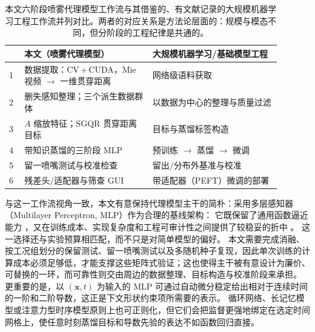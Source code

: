 \begin{table}[htbp]
\centering
\footnotesize
\caption{本文六阶段喷雾代理模型工作流与其借鉴的、有文献记录的大规模机器学习工程工作流并列对比。两者的对应关系是方法论层面的：规模与模态不同，但分阶段的工程纪律是共通的。}
\label{tab:workflow-mapping-zh}
\begin{tabular}{@{}p{0.05\linewidth}p{0.42\linewidth}p{0.42\linewidth}@{}}
\toprule
 & \textbf{本文（喷雾代理模型）} & \textbf{大规模机器学习/基础模型工程} \\
\midrule
1 & 数据提取：CV\,+\,CUDA，Mie 视频 $\to$ 一维贯穿距离 & 网络级语料获取 \cite{Penedo2023RefinedWeb} \\
2 & 删失感知整理；三个派生数据群体 & 以数据为中心的整理与质量过滤 \cite{Albalak2024DataSelection} \\
3 & $A$ 缩放特征；$\mathrm{SGQR}$ 贯穿距离目标 & 目标与蒸馏标签构造 \cite{Xu2024LLMDistillation} \\
4 & 带知识蒸馏的三阶段 MLP & 预训练 $\to$ 蒸馏 $\to$ 微调 \cite{Zhao2023LLMSurvey} \\
5 & 留一喷嘴测试与校准检查 & 留出/分布外基准与校准 \cite{Chang2024LLMEval} \\
6 & 残差头/适配器与筛查 GUI & 带适配器（PEFT）微调的部署 \cite{Han2024PEFT} \\
\bottomrule
\end{tabular}
\end{table}

与这一工作流视角一致，本文有意保持代理模型主干的简朴：采用多层感知器（Multilayer Perceptron, MLP）作为合理的基线架构：
它既保留了通用函数逼近能力 \cite{Hornik1989UAT}，又在训练成本、实现复杂度和工程可审计性之间提供了较稳妥的折中 \cite{BishopPRML2006}。
这一选择还与实验预算相匹配，而不只是对简单模型的偏好。
本文需要完成消融、按工况组划分的保留测试、留一喷嘴测试以及多随机种子复现，因此单次训练的计算成本必须足够低，才能支撑这些矩阵式验证；这也使得主干被有意设计为廉价、可替换的一环，而可靠性则交由周边的数据整理、目标构造与校准阶段来承担。
更重要的是，以 \((\mathbf{x},t)\) 为输入的 MLP 可通过自动微分稳定给出相对于连续时间的一阶和二阶导数，这正是下文形状约束项所需要的表示。
循环网络、长记忆模型或注意力型时序模型原则上也可正则化，但它们会把监督更强地绑定在选定时间网格上，使任意时刻蒸馏目标和导数先验的表达不如函数回归直接。

